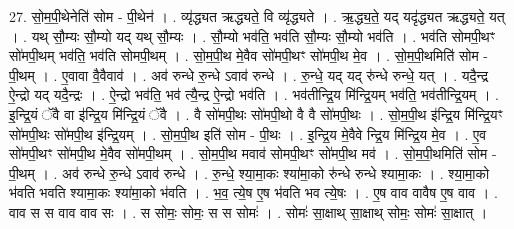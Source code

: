 \documentclass[17pt]{extarticle}
\begin{document}
27. सो॒म॒पी॒थेनेति॑ सोम - पी॒थेन॑ । . व्यृ॑द्ध्यत ऋद्ध्यते॒ वि व्यृ॑द्ध्यते । . ऋ॒द्ध्य॒ते॒ यद् यदृ॑द्ध्यत ऋद्ध्यते॒ यत् । . यथ् सौ॒म्यः सौ॒म्यो यद् यथ् सौ॒म्यः । . सौ॒म्यो भव॑ति॒ भव॑ति सौ॒म्यः सौ॒म्यो भव॑ति । . भव॑ति सोमपी॒थꣳ सो॑मपी॒थम् भव॑ति॒ भव॑ति सोमपी॒थम् । . सो॒म॒पी॒थ मे॒वैव सो॑मपी॒थꣳ सो॑मपी॒थ मे॒व । . सो॒म॒पी॒थमिति॑ सोम - पी॒थम् । . ए॒वावा वै॒वैवाव॑ । . अव॑ रुन्धे रु॒न्धे ऽवाव॑ रुन्धे । . रु॒न्धे॒ यद् यद् रु॑न्धे रुन्धे॒ यत् । . यदै॒न्द्र ऐ॒न्द्रो यद् यदै॒न्द्रः । . ऐ॒न्द्रो भव॑ति॒ भव॑ त्यै॒न्द्र ऐ॒न्द्रो भव॑ति । . भव॑तीन्द्रि॒य मि॑न्द्रि॒यम् भव॑ति॒ भव॑तीन्द्रि॒यम् । . इ॒न्द्रि॒यं ॅवै वा इ॑न्द्रि॒य मि॑न्द्रि॒यं ॅवै । . वै सो॑मपी॒थः सो॑मपी॒थो वै वै सो॑मपी॒थः । . सो॒म॒पी॒थ इ॑न्द्रि॒य मि॑न्द्रि॒यꣳ सो॑मपी॒थः सो॑मपी॒थ इ॑न्द्रि॒यम् । . सो॒म॒पी॒थ इति॑ सोम - पी॒थः । . इ॒न्द्रि॒य मे॒वैवे न्द्रि॒य मि॑न्द्रि॒य मे॒व । . ए॒व सो॑मपी॒थꣳ सो॑मपी॒थ मे॒वैव सो॑मपी॒थम् । . सो॒म॒पी॒थ मवाव॑ सोमपी॒थꣳ सो॑मपी॒थ मव॑ । . सो॒म॒पी॒थमिति॑ सोम - पी॒थम् । . अव॑ रुन्धे रु॒न्धे ऽवाव॑ रुन्धे । . रु॒न्धे॒ श्या॒मा॒कः श्या॑मा॒को रु॑न्धे रुन्धे श्यामा॒कः । . श्या॒मा॒को भ॑वति भवति श्यामा॒कः श्या॑मा॒को भ॑वति । . भ॒व॒ त्ये॒ष ए॒ष भ॑वति भव त्ये॒षः । . ए॒ष वाव वावैष ए॒ष वाव । . वाव स स वाव वाव सः । . स सोमः॒ सोमः॒ स स सोमः॑ । . सोमः॑ सा॒क्षाथ् सा॒क्षाथ् सोमः॒ सोमः॑ सा॒क्षात् । \newline
\end{document}
